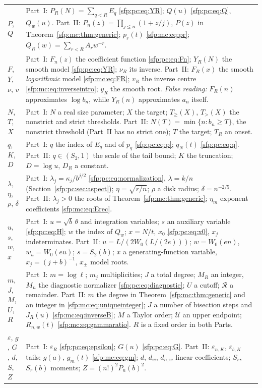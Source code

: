 \documentclass[11pt,letterpaper]{article}
\numberwithin{equation}{section}
\theoremstyle{definition}\newtheorem{definition}[theorem]{Definition}
\theoremstyle{remark}\newtheorem{remark}[theorem]{Remark}
\newcommand{\eps}{\varepsilon}
\begin{document}
\begin{longtable}{@{}>{\raggedright\arraybackslash}p{} >{\raggedright\arraybackslash}p{}@{}}
$P$, $Q$ & Part~I: $P_R(N)=\sum_{q<R}E_q$ \eqref{sfp:pc:eq:YR}; $Q(u)$ \eqref{sfp:pc:eq:Q}, $Q_w(u)$. Part~II: $P_n(z)=\prod_{j\le n}(1+z/j)$, $P(z)$ in Theorem~\ref{sfp:mc:thm:generic}; $p_r(t)$ \eqref{sfp:mc:eq:pr}; $Q_R(w)=\sum_{r<R}A_rw^{-r}$.\\
$F$, $Y$, $\nu$, $v$ & Part~I: $F_n(z)$ the coefficient function \eqref{sfp:pc:eq:Fn}; $Y_R(N)$ the smooth model \eqref{sfp:pc:eq:YR}; $\nu_R$ its inverse. Part~II: $F_R(x)$ the smooth \emph{logarithmic} model \eqref{sfp:mc:eq:FR}; $v_R$ the inverse centre \eqref{sfp:mc:eq:inverseintro}; $y_R$ the smooth root. \emph{False reading:} $F_R(n)$ approximates $\log b_n$, while $Y_R(n)$ approximates $a_n$ itself.\\
$N$, $T$, $X$ & Part~I: $N$ a real size parameter; $X$ the target; $T_\ge(X)$, $T_>(X)$ the nonstrict and strict thresholds. Part~II: $N(T)=\min\{n:b_n\ge T\}$, the nonstrict threshold (Part~II has no strict one); $T$ the target; $T_R$ an onset.\\
$q$, $K$, $D$ & Part~I: $q$ the index of $E_q$ and of $p_q$ \eqref{sfp:pc:eq:p}; $q_N(t)$ \eqref{sfp:pc:eq:q}. Part~II: $q\in(S_2,1)$ the scale of the tail bound; $K$ the truncation; $D=\log u$, $D_R$ a constant.\\
$\lambda$, $\eta$, $\rho$, $\delta$ & Part~I: $\lambda_j=\kappa_j/b^{j/2}$ \eqref{sfp:pc:eq:normalization}, $\lambda=k/n$ (Section~\ref{sfp:pc:sec:aspect}); $\eta=\sqrt{r/n}$; $\rho$ a disk radius; $\delta=n^{-2/5}$. Part~II: $\lambda_j>0$ the roots of Theorem~\ref{sfp:mc:thm:generic}; $\eta_m$ exponent coefficients \eqref{sfp:mc:eq:Erec}.\\
$u$, $s$, $w$, $x$ & Part~I: $u=\sqrt b\,\theta$ and integration variables; $s$ an auxiliary variable \eqref{sfp:pc:eq:H}; $w$ the index of $Q_w$; $x=N/t$, $x_0$ \eqref{sfp:pc:eq:x0}, $x_j$ indeterminates. Part~II: $u=L/(2W_0(L/(2e)))$; $w=W_0(en)$, $w_u=W_0(eu)$; $s=S_2(b)$; $x$ a generating-function variable, $x_j=(j+b)^{-1}$, $x_\pm$ model roots.\\
$m$, $J$, $M$, $U$, $R$ & Part~I: $m=\log\ell$; $m_j$ multiplicities; $J$ a total degree; $M_R$ an integer, $M_n$ the diagnostic normalizer \eqref{sfp:pc:eq:diagnostic}; $U$ a cutoff; $\mathcal R$ a remainder. Part~II: $m$ the degree in Theorem~\ref{sfp:mc:thm:generic} and an integer in \eqref{sfp:mc:eq:uniqueinteger}; $J$ a number of bisection steps and $J_R(u)$ \eqref{sfp:mc:eq:inverseB}; $M$ a Taylor order; $\mathcal U$ an upper endpoint; $R_{n,w}(t)$ \eqref{sfp:mc:eq:gammaratio}. $R$ is a fixed order in both Parts.\\
$\eps$, $g$, $G$, $d$, $S$, $Z$ & Part~I: $\eps_R$ \eqref{sfp:pc:eq:epsilon}; $G(u)$ \eqref{sfp:pc:eq:G}. Part~II: $\varepsilon_{n,K}$, $\varepsilon_{b,K}$ tails; $g(a)$, $g_m(t)$ \eqref{sfp:mc:eq:gm}; $d$, $d_w$, $d_{n,w}$ linear coefficients; $S_r$, $S_r(b)$ moments; $Z=(n!)^2P_n(b)^2$.\\
\bottomrule
\end{longtable}
\addtocounter{table}{-1}%
\endgroup
\end{document}
